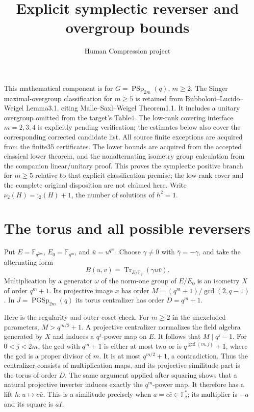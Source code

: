 \documentclass[10pt]{article}
\title{Explicit symplectic reverser and overgroup bounds}
\author{Human Compression project}\date{}
\newcommand{\ii}{\mathrm i_2}\newcommand{\nuu}{\nu_2}\newcommand{\F}{\mathbb F}\newcommand{\GL}{\operatorname{GL}}\newcommand{\GU}{\operatorname{GU}}\newcommand{\Sp}{\operatorname{Sp}}\newcommand{\PSp}{\operatorname{PSp}}\newcommand{\PGSp}{\operatorname{PGSp}}\newcommand{\Aut}{\operatorname{Aut}}
\begin{document}
\maketitle
This mathematical component is for $G=\PSp_{2m}(q)$, $m\ge2$.
The Singer maximal-overgroup classification for $m\ge5$ is retained from
Bubboloni--Lucido--Weigel Lemma3.1, citing Malle--Saxl--Weigel Theorem1.1.
It includes a unitary overgroup omitted from the target's Table4. The
low-rank covering interface $m=2,3,4$ is explicitly pending verification;
the estimates below also cover the corresponding corrected candidate list.
All source finite exceptions are acquired from the finite35 certificates.
The lower bounds are acquired from the accepted classical lower theorem,
and the nonalternating isometry group calculation from the companion
linear/unitary proof. This proves the symplectic positive branch for $m\ge5$ relative to that
explicit classification premise; the low-rank cover and the complete original
disposition are not claimed here.
Write $\nuu(H)=\ii(H)+1$, the number of solutions of $h^2=1$.

\section{The torus and all possible reversers}
Put $E=\F_{q^{2m}}$, $E_0=\F_{q^m}$, and $\bar u=u^{q^m}$. Choose
$\gamma\ne0$ with $\bar\gamma=-\gamma$, and take the alternating form
\[
 B(u,v)=\operatorname{Tr}_{E/\F_q}(\gamma u\bar v).
\]
Multiplication by a generator $\omega$ of the norm-one group of $E/E_0$
is an isometry $X$ of order $q^m+1$. Its projective image $x$ has order
$M=(q^m+1)/\gcd(2,q-1)$. In $J=\PGSp_{2m}(q)$ its torus centralizer
has order $D=q^m+1$.

Here is the regularity and outer-coset check. For $m\ge2$ in the unexcluded
parameters, $M>q^{m/2}+1$. A projective centralizer normalizes the field
algebra generated by $X$ and induces a $q^j$-power map on $E$. It follows
that $M\mid q^j-1$. For $0<j<2m$, the gcd with $q^m+1$ is either at most
two or is $q^{\gcd(m,j)}+1$, where the gcd is a proper divisor of $m$.
It is at most $q^{m/2}+1$, a contradiction. Thus the centralizer consists
of multiplication maps, and its projective similitude part is the torus of
order $D$. The same argument applied after squaring shows that a natural
projective inverter induces exactly the $q^m$-power map. It therefore has a
lift $h:u\mapsto c\bar u$. This is a similitude precisely when
$a=c\bar c\in\F_q^*$; its multiplier is $-a$ and its square is $aI$.
\end{document}
